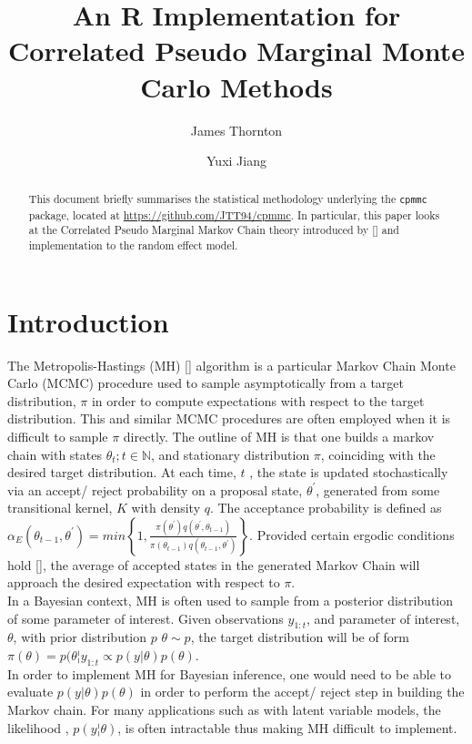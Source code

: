 \documentclass{article}
\title{An R Implementation for Correlated Pseudo Marginal Monte Carlo Methods}
\author{James Thornton \and Yuxi Jiang}
\begin{document}



\maketitle

\begin{abstract}
This document briefly summarises the statistical methodology underlying the \texttt{cpmmc} package, located at \url{https://github.com/JTT94/cpmmc}. In particular, this paper looks at the Correlated Pseudo Marginal Markov Chain theory introduced by [] and implementation to the random effect model.
\end{abstract}

\section{Introduction}

The Metropolis-Hastings (MH) [] algorithm is a particular Markov Chain Monte Carlo (MCMC) procedure used to sample asymptotically from a target distribution, $\pi$ in order to compute expectations with respect to the target distribution. This and similar MCMC procedures are often employed when it is difficult to sample $ \pi$ directly. The outline of MH is that one builds a markov chain with states $ \theta_t; t \in \mathbb{N}$, and stationary distribution $\pi$, coinciding with the desired target distribution. At each time, $ t $ , the state is updated stochastically via an accept/ reject probability on a proposal state, $\theta^\prime$, generated from some transitional kernel, $K$ with density $q$. The acceptance probability is defined as  $ \alpha_E(\theta_{t-1}, \theta^\prime) = min\left\{1,  \frac{
                \pi(\theta^\prime) q(\theta^\prime, \theta_{t-1})}
                {\pi(\theta_{t-1}) q(\theta_{t-1}, \theta^\prime)}
\right\} $. Provided certain ergodic conditions hold [], the average of accepted states in the generated Markov Chain will approach the desired expectation with respect to $\pi$. \\

In a Bayesian context, MH is often used to sample from a posterior distribution of some parameter of interest. Given observations $y_{1:t}$, and parameter of interest, $\theta$, with prior distribution $p$ $\theta \sim p$, the target distribution will be of form $\pi (\theta) = p(\theta ¦ y_{1:t} \propto p(y|\theta) p(\theta)$.\\

In order to implement MH for Bayesian inference, one would need to be able to evaluate $p(y|\theta) p(\theta)$ in order to perform the accept/ reject step in building the Markov chain. For many applications such as with latent variable models, the likelihood , $ p(y ¦ \theta)$, is often intractable thus making MH difficult to implement. \\
\end{document}
